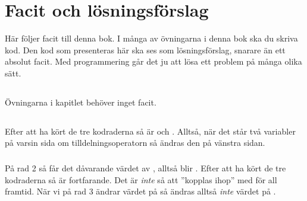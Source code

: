 %
%
\chapter{Facit och lösningsförslag}\label{ch:facit}
Här följer facit till denna bok. I många av övningarna i denna bok ska du skriva kod. Den kod som presenteras här ska ses som lösningsförslag, snarare än ett absolut facit. Med programmering går det ju att lösa ett problem på många olika sätt.

\section*{}

Övningarna i kapitlet behöver inget facit.


\section*{}

\subsection*{}
Efter att ha kört de tre kodraderna så är  och . Alltså, när det står två variabler på varsin sida om tilldelningsoperatorn så ändras den på vänstra sidan.

\subsection*{}
På rad 2 så får  det dåvarande värdet av , alltså blir . Efter att ha kört de tre kodraderna så är  fortfarande. Det är \emph{inte} så att  ''kopplas ihop'' med  för all framtid. När vi på rad 3 ändrar värdet på  så ändras alltså \emph{inte} värdet på .

